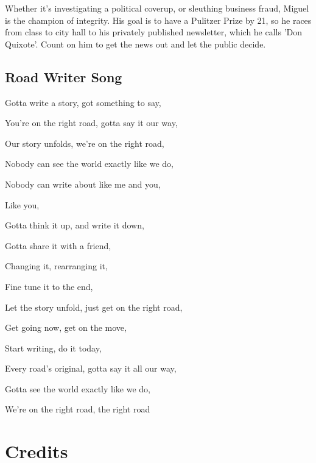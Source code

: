 Whether it's investigating a political coverup, or sleuthing business fraud, Miguel is the champion of integrity.
His goal is to have a Pulitzer Prize by 21, so he races from class to city hall to his privately published newsletter, which he calls 'Don Quixote'.
Count on him to get the news out and let the public decide.

\subsection{Road Writer Song}

Gotta write a story, got something to say,

You're on the right road, gotta say it our way,

Our story unfolds, we're on the right road,

Nobody can see the world exactly like we do,

Nobody can write about like me and you,

Like you,

Gotta think it up, and write it down,

Gotta share it with a friend,

Changing it, rearranging it,

Fine tune it to the end,

Let the story unfold, just get on the right road,

Get going now, get on the move,

Start writing, do it today,

Every road's original, gotta say it all our way,

Gotta see the world exactly like we do,

We're on the right road, the right road

\section{Credits}

